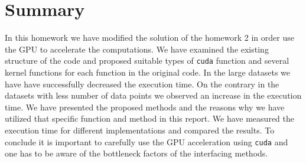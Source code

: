 \section{Summary}
In this homework we have modified the solution of the homework 2 in order use the GPU to accelerate the computations. We have examined the existing structure of the code and proposed suitable types of \texttt{cuda} function and several kernel functions for each function in the original code. In the large datasets we have have successfully decreased the execution time. On the contrary in the datasets with less number of data points we observed an increase in the execution time. We have presented the proposed methods and the reasons why we have utilized that specific function and method in this report. We have measured the execution time for different implementations and compared the results. To conclude it is important to carefully use the GPU acceleration using \texttt{cuda} and one has to be aware of the bottleneck factors of the interfacing methods.